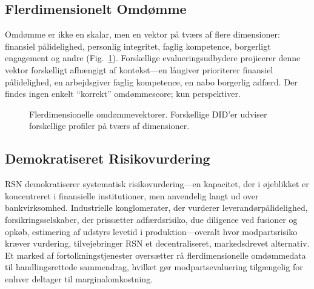 \documentclass[11pt,a4paper,twocolumn]{article}
\begin{document}
\subsection{Flerdimensionelt Omdømme}

Omdømme er ikke en skalar, men en vektor på tværs af flere dimensioner: finansiel pålidelighed, personlig integritet, faglig kompetence, borgerligt engagement og andre (Fig.~\ref{fig:reputation-radar}). Forskellige evalueringsudbydere projicerer denne vektor forskelligt afhængigt af kontekst---en långiver prioriterer finansiel pålidelighed, en arbejdsgiver faglig kompetence, en nabo borgerlig adfærd. Der findes ingen enkelt ``korrekt'' omdømmescore; kun perspektiver.

\begin{figure}[ht]
\centering
{}
\caption{Flerdimensionelle omdømmevektorer. Forskellige DID'er udviser forskellige profiler på tværs af dimensioner.}
\label{fig:reputation-radar}
\end{figure}

\subsection{Demokratiseret Risikovurdering}

RSN demokratiserer systematisk risikovurdering---en kapacitet, der i øjeblikket er koncentreret i finansielle institutioner, men anvendelig langt ud over bankvirksomhed. Industrielle konglomerater, der vurderer leverandørpålidelighed, forsikringsselskaber, der prissætter adfærdsrisiko, due diligence ved fusioner og opkøb, estimering af udstyrs levetid i produktion---overalt hvor modpartsrisiko kræver vurdering, tilvejebringer RSN et decentraliseret, markedsdrevet alternativ. Et marked af fortolkningstjenester oversætter rå flerdimensionelle omdømmedata til handlingsrettede sammendrag, hvilket gør modpartsevaluering tilgængelig for enhver deltager til marginalomkostning.
\end{document}
